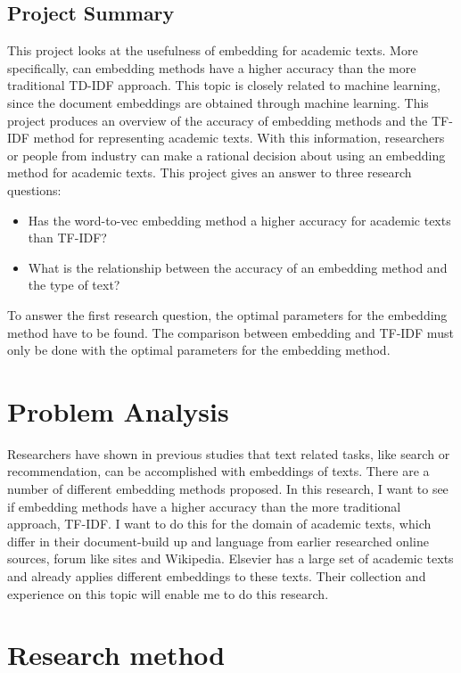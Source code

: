 \documentclass[10pt,a4paper]{article}
\begin{document}
\subsection{Project Summary}
This project looks at the usefulness of embedding for academic texts. More specifically, can embedding methods have a higher accuracy than the more traditional TD-IDF approach. This topic is closely related to machine learning, since the document embeddings are obtained through machine learning. This project produces an overview of the accuracy of embedding methods and the TF-IDF method for representing academic texts. With this information, researchers or people from industry can make a rational decision about using an embedding method for academic texts. This project gives an answer to three research questions:
\begin{itemize}
\item{Has the word-to-vec embedding method a higher accuracy for academic texts than TF-IDF?}
\item{What is the relationship between the accuracy of an embedding method and the type of text?}
\end{itemize}
To answer the first research question, the optimal parameters for the embedding method have to be found. The comparison between embedding and TF-IDF must only be done with the optimal parameters for the embedding method.
\section{Problem Analysis}
Researchers have shown in previous studies that text related tasks, like search or recommendation, can be accomplished with embeddings of texts. There are a number of different embedding methods proposed. In this research, I want to see if embedding methods have a higher accuracy than the more traditional approach, TF-IDF. I want to do this for the domain of academic texts, which differ in their document-build up and language from earlier researched online sources, forum like sites and Wikipedia. Elsevier has a large set of academic texts and already applies different embeddings to these texts. Their collection and experience on this topic will enable me to do this research.

\section{Research method}
\end{document}
